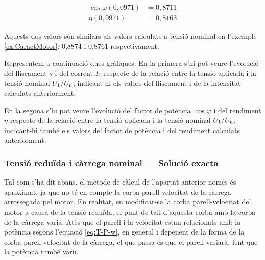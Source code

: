 \begin{exemple}
	\begin{align*}
	\cos\varphi(0{,}0971) &=  0{,}8711 \\
	\eta(0{,}0971) &=  0{,}8163
	\end{align*}
	
	Aquests dos valors són similars als valors calculats a tensió nominal en  l'exemple \ref{ex:CaractMotor}: 0,8874 i 0,8761 respectivament.
	
	Representem a continuació dues gràfiques. En la primera s'hi pot veure  l'evolució del lliscament $s$ i del corrent $I_1$ respecte de la relació entre la tensió aplicada i la tensió nominal $U_1/U_\mathrm{n}$, indicant-hi els valors del lliscament i de la intensitat calculats anteriorment:
	\begin{center}
		
	\end{center}

	En la segona s'hi pot veure l'evolució del factor de potència $\cos\varphi$ i del rendiment $\eta$ respecte de la relació entre la tensió aplicada i la tensió nominal $U_1/U_\mathrm{n}$, indicant-hi també  els valors del factor de potència i del rendiment calculats anteriorment:
	\begin{center}
		
	\end{center}	
\end{exemple}

\subsubsection{Tensió reduïda i càrrega nominal --- Solució exacta}

Tal com s'ha dit abans, el mètode de càlcul de l'apartat anterior només és aproximat, ja que no té en compte la corba parell-velocitat de la càrrega arrossegada pel motor. En realitat, en modificar-se la corba parell-velocitat del motor a causa de la tensió reduïda, el punt de tall d'aquesta corba amb la corba de la càrrega varia. Atès que el parell i la velocitat estan relacionats amb la potència segons l'equació  \eqref{eq:T-P-w}, en general i depenent de la forma de la corba parell-velocitat de la càrrega, el que passa és que el parell variarà, fent que la potència també variï.

